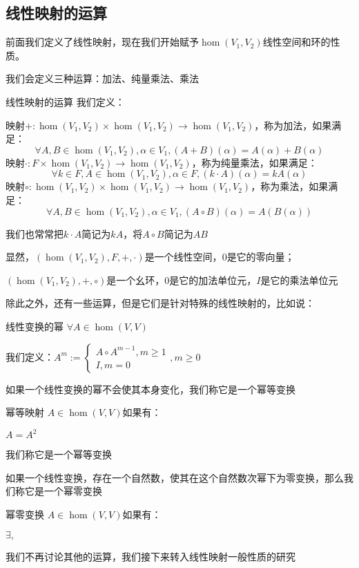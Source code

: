 \documentclass[12pt, a4paper, oneside, UTF8]{ctexbook}
\begin{document}
		\subsection{线性映射的运算}
			前面我们定义了线性映射，现在我们开始赋予$\hom (V_1,V_2)$线性空间和环的性质。

			我们会定义三种运算：加法、纯量乘法、乘法
			\begin{defn}{线性映射的运算}{}
				我们定义：
				
				映射$+:\hom(V_1,V_2) \times \hom(V_1,V_2) \rightarrow \hom(V_1,V_2)$，称为加法，如果满足：
				\begin{equation}
					\forall A,B \in \hom(V_1,V_2),\alpha \in V_1,(A+B)(\alpha )=A(\alpha )+B(\alpha )
				\end{equation}
				映射$\cdot:F \times \hom(V_1,V_2) \rightarrow \hom(V_1,V_2)$，称为纯量乘法，如果满足：
				\begin{equation}
					\forall k \in F,A \in \hom(V_1,V_2),\alpha \in F,(k\cdot A)(\alpha )=kA(\alpha )
				\end{equation}
				映射$\circ:\hom(V_1,V_2) \times \hom(V_1,V_2) \rightarrow \hom(V_1,V_2)$，称为乘法，如果满足：
				\begin{equation}
					\forall A,B \in \hom(V_1,V_2),\alpha \in V_1,(A\circ B)(\alpha )=A\left(B(\alpha )\right)
				\end{equation}
			\end{defn}
			我们也常常把$k\cdot A$简记为$kA$，将$A \circ B$简记为$AB$

			显然，$\left(\hom(V_1,V_2),F,+,\cdot\right)$是一个线性空间，$0$是它的零向量；

			$\left(\hom(V_1,V_2),+,\circ\right)$是一个幺环，$0$是它的加法单位元，$I$是它的乘法单位元

			除此之外，还有一些运算，但是它们是针对特殊的线性映射的，比如说：
			\begin{defn}{线性变换的幂}{}
				$\forall A \in \hom(V,V)$

				我们定义：$A^m:= \begin{cases}
					A\circ A^{m-1},m \geqslant 1 \\
					I,m = 0
				\end{cases},m \geqslant 0$
			\end{defn}
			如果一个线性变换的幂不会使其本身变化，我们称它是一个幂等变换
			\begin{defn}{幂等映射}{}
				$A \in \hom(V,V)$如果有：

				$A = A^2$

				我们称它是一个幂等变换
			\end{defn}
			如果一个线性变换，存在一个自然数，使其在这个自然数次幂下为零变换，那么我们称它是一个幂零变换
			\begin{defn}{幂零变换}{}
				$A \in \hom(V,V)$如果有：

				$\exists,$
			\end{defn}
			我们不再讨论其他的运算，我们接下来转入线性映射一般性质的研究
\end{document}
